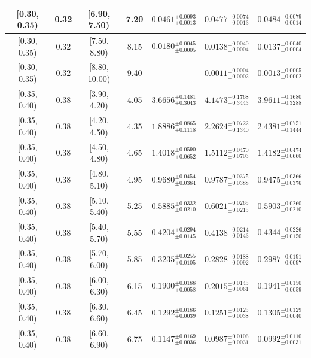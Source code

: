 \begin{longtable}{|c|c|c|c|c|c|c|}
[0.30, 0.35) & 0.32 & [6.90, 7.50) & 7.20 & $0.0461^{ \pm 0.0093 }_{ \pm 0.0013 }$ & $0.0477^{ \pm 0.0074 }_{ \pm 0.0013 }$ & $0.0484^{ \pm 0.0079 }_{ \pm 0.0014 }$ \\ 
\hline
[0.30, 0.35) & 0.32 & [7.50, 8.80) & 8.15 & $0.0180^{ \pm 0.0045 }_{ \pm 0.0005 }$ & $0.0138^{ \pm 0.0040 }_{ \pm 0.0004 }$ & $0.0137^{ \pm 0.0040 }_{ \pm 0.0004 }$ \\ 
\hline
[0.30, 0.35) & 0.32 & [8.80, 10.00) & 9.40 & - & $0.0011^{ \pm 0.0004 }_{ \pm 0.0002 }$ & $0.0013^{ \pm 0.0005 }_{ \pm 0.0002 }$ \\ 
\hline
[0.35, 0.40) & 0.38 & [3.90, 4.20) & 4.05 & $3.6656^{ \pm 0.1481 }_{ \pm 0.3043 }$ & $4.1473^{ \pm 0.1768 }_{ \pm 0.3443 }$ & $3.9611^{ \pm 0.1680 }_{ \pm 0.3288 }$ \\ 
\hline
[0.35, 0.40) & 0.38 & [4.20, 4.50) & 4.35 & $1.8886^{ \pm 0.0865 }_{ \pm 0.1118 }$ & $2.2624^{ \pm 0.0722 }_{ \pm 0.1340 }$ & $2.4381^{ \pm 0.0751 }_{ \pm 0.1444 }$ \\ 
\hline
[0.35, 0.40) & 0.38 & [4.50, 4.80) & 4.65 & $1.4018^{ \pm 0.0590 }_{ \pm 0.0652 }$ & $1.5112^{ \pm 0.0470 }_{ \pm 0.0703 }$ & $1.4182^{ \pm 0.0474 }_{ \pm 0.0660 }$ \\ 
\hline
[0.35, 0.40) & 0.38 & [4.80, 5.10) & 4.95 & $0.9680^{ \pm 0.0454 }_{ \pm 0.0384 }$ & $0.9787^{ \pm 0.0375 }_{ \pm 0.0388 }$ & $0.9475^{ \pm 0.0366 }_{ \pm 0.0376 }$ \\ 
\hline
[0.35, 0.40) & 0.38 & [5.10, 5.40) & 5.25 & $0.5885^{ \pm 0.0332 }_{ \pm 0.0210 }$ & $0.6021^{ \pm 0.0265 }_{ \pm 0.0215 }$ & $0.5903^{ \pm 0.0260 }_{ \pm 0.0210 }$ \\ 
\hline
[0.35, 0.40) & 0.38 & [5.40, 5.70) & 5.55 & $0.4204^{ \pm 0.0294 }_{ \pm 0.0145 }$ & $0.4138^{ \pm 0.0214 }_{ \pm 0.0143 }$ & $0.4344^{ \pm 0.0226 }_{ \pm 0.0150 }$ \\ 
\hline
[0.35, 0.40) & 0.38 & [5.70, 6.00) & 5.85 & $0.3235^{ \pm 0.0255 }_{ \pm 0.0105 }$ & $0.2828^{ \pm 0.0188 }_{ \pm 0.0092 }$ & $0.2987^{ \pm 0.0191 }_{ \pm 0.0097 }$ \\ 
\hline
[0.35, 0.40) & 0.38 & [6.00, 6.30) & 6.15 & $0.1900^{ \pm 0.0188 }_{ \pm 0.0058 }$ & $0.2015^{ \pm 0.0145 }_{ \pm 0.0061 }$ & $0.1941^{ \pm 0.0150 }_{ \pm 0.0059 }$ \\ 
\hline
[0.35, 0.40) & 0.38 & [6.30, 6.60) & 6.45 & $0.1292^{ \pm 0.0186 }_{ \pm 0.0039 }$ & $0.1251^{ \pm 0.0125 }_{ \pm 0.0038 }$ & $0.1305^{ \pm 0.0129 }_{ \pm 0.0040 }$ \\ 
\hline
[0.35, 0.40) & 0.38 & [6.60, 6.90) & 6.75 & $0.1147^{ \pm 0.0169 }_{ \pm 0.0036 }$ & $0.0987^{ \pm 0.0106 }_{ \pm 0.0031 }$ & $0.0992^{ \pm 0.0110 }_{ \pm 0.0031 }$ \\ 

\end{longtable}
